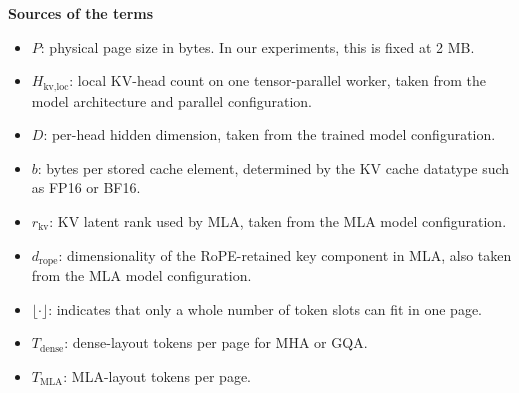 \documentclass[12pt]{article}
\begin{document}
\noindent\textbf{Sources of the terms}
\begin{itemize}
    \item $P$: physical page size in bytes. In our experiments, this is fixed at 2 MB.
    \item $H_{\text{kv,loc}}$: local KV-head count on one tensor-parallel worker, taken from the model architecture and parallel configuration.
    \item $D$: per-head hidden dimension, taken from the trained model configuration.
    \item $b$: bytes per stored cache element, determined by the KV cache datatype such as FP16 or BF16.
    \item $r_{\text{kv}}$: KV latent rank used by MLA, taken from the MLA model configuration.
    \item $d_{\text{rope}}$: dimensionality of the RoPE-retained key component in MLA, also taken from the MLA model configuration.
    \item $\lfloor \cdot \rfloor$: indicates that only a whole number of token slots can fit in one page.
    \item $T_{\text{dense}}$: dense-layout tokens per page for MHA or GQA.
    \item $T_{\text{MLA}}$: MLA-layout tokens per page.
\end{itemize}
\end{document}
